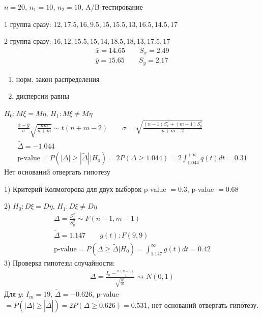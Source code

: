 \documentclass{article}
\begin{document}
\begin{eg}
  $n=20$, $n_1=10$, $n_2=10$, A/B тестирование

  1 группа сразу: $12, 17.5, 16, 9.5, 15, 15.5, 13, 16.5, 14.5, 17$
  
  2 группа сразу: $16, 12, 15.5, 15, 14, 18.5, 18, 13, 17.5, 17$
  \begin{gather*}
    \bar{x}=14.65 \qquad S_x=2.49 \\ 
    \bar{y}=15.65 \qquad S_y = 2.17
  \end{gather*}
  \begin{enumerate}
    \item норм. закон распределения
    \item дисперсии равны
  \end{enumerate}
  $H_0: M\xi=M\eta$, $H_1:M\xi\neq M\eta$
  \begin{gather*}
    \frac{\bar{x}-\bar{y}}{\sigma}\sqrt{\frac{nm}{n+m}}\sim t(n+m-2) \qquad \sigma = \sqrt{\frac{(n-1)S_x^{2}+(m-1)S_y^{2}}{n+m-2}} \\ 
    \tilde{\Delta}=-1.044 \\ 
    \text{p-value} = P(|\Delta| \ge |\tilde{\Delta}| | H_0) = 2P(\Delta \ge 1.044) 
    = 2 \int_{1.044}^{+\infty}q(t)dt=0.31
  \end{gather*}
  Нет оснований отвергать гипотезу
\end{eg}

1) Критерий Колмогорова для двух выборок p-value $=0.3$, p-value $=0.68$

2) $H_0: D\xi=D\eta$, $H_1: D\xi \neq D\eta$
\begin{gather*}
 \Delta = \frac{S_x^{2}}{S_y^{2}} \sim F(n-1, m-1) \\ 
 \tilde{\Delta} = 1.147 \qquad g(t): F(9,9)\\ 
 \text{p-value}=P(\Delta \ge \tilde{\Delta} | H_0) = \int_{1.147}^{\infty}g(t)dt=0.42
\end{gather*}
3) Проверка гипотезы случайности:
\begin{gather*}
  \Delta=\frac{I_n-\frac{n(n-1)}{4}}{\sqrt{\frac{n^{3}}{36}}} \rightsquigarrow N(0,1)
\end{gather*}
Для $y$: $I_m=19$, $\tilde{\Delta}=-0.626$, p-value $=P(|\Delta| \ge |\tilde{\Delta}|)=2P(\Delta \ge 0.626)=0.531$,
нет оснований отвергать гипотезу.
\end{document}
